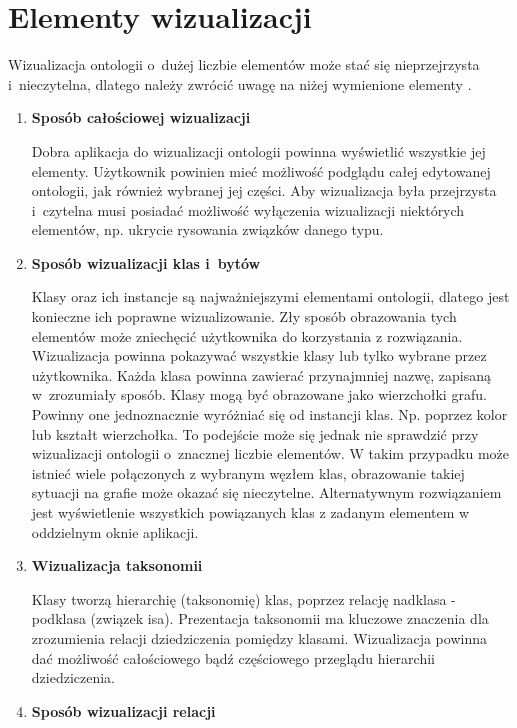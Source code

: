 \section{Elementy wizualizacji}
Wizualizacja ontologii o~dużej liczbie elementów może stać się nieprzejrzysta i~nieczytelna, dlatego należy zwrócić uwagę na niżej wymienione elementy \cite{vizComp}.
\begin{enumerate}
\item{\bf Sposób całościowej wizualizacji}

\nopagebreak

Dobra aplikacja do wizualizacji ontologii powinna wyświetlić wszystkie jej elementy. Użytkownik powinien mieć możliwość podglądu całej edytowanej
ontologii, jak również wybranej jej części. Aby wizualizacja była przejrzysta i~czytelna musi posiadać możliwość wyłączenia wizualizacji niektórych elementów, 
np. ukrycie  rysowania związków danego typu.
\item{\bf Sposób wizualizacji klas i~bytów}

\nopagebreak

Klasy oraz ich instancje są najważniejszymi elementami ontologii, dlatego jest konieczne ich poprawne wizualizowanie. Zły sposób obrazowania tych elementów 
może zniechęcić użytkownika do korzystania z rozwiązania. Wizualizacja powinna pokazywać wszystkie klasy lub tylko wybrane przez użytkownika. 
Każda klasa powinna zawierać przynajmniej nazwę, zapisaną w~zrozumiały sposób. Klasy mogą być obrazowane jako wierzchołki grafu. Powinny one jednoznacznie
 wyróżniać się od instancji klas. Np. poprzez kolor lub kształt wierzchołka. To podejście może się jednak nie sprawdzić przy wizualizacji ontologii o~znacznej
liczbie elementów. W takim przypadku może istnieć wiele połączonych z wybranym węzłem klas, obrazowanie takiej sytuacji na grafie może okazać się nieczytelne. 
Alternatywnym rozwiązaniem jest wyświetlenie wszystkich powiązanych klas z zadanym elementem w oddzielnym oknie aplikacji.   

\item{\bf Wizualizacja taksonomii}

\nopagebreak

Klasy tworzą hierarchię (taksonomię) klas, poprzez relację nadklasa - podklasa (związek isa). Prezentacja taksonomii ma kluczowe znaczenia dla
 zrozumienia relacji dziedziczenia pomiędzy klasami. Wizualizacja powinna dać możliwość całościowego bądź częściowego przeglądu hierarchii dziedziczenia.

\item{\bf Sposób wizualizacji relacji}


\end{enumerate}
